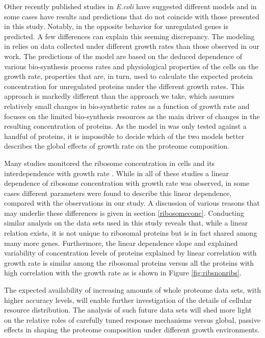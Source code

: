 \documentclass[a4paper]{article}
\begin{document}
Other recently published studies in \emph{E.coli} have suggested different models and in some cases have results  and predictions that do not coincide with those presented in this study.
Notably, in \cite{Klumpp2009a} the opposite behavior for unregulated genes is predicted.
A few differences can explain this seeming discrepancy.
The modeling in \cite{Klumpp2009a} relies on data collected under different growth rates than those observed in our work.
The predictions of the model are based on the deduced dependence of various bio-synthesis process rates and physiological properties of the cells on the growth rate, properties that are, in turn, used to calculate the expected protein concentration for unregulated proteins under the different growth rates.
This approach is markedly different than the approach we take, which assumes relatively small changes in bio-synthetic rates as a function of growth rate and focuses on the limited bio-synthesis resources as the main driver of changes in the resulting concentration of proteins.
As the model in \cite{Klumpp2009a} was only tested against a handful of proteins, it is impossible to decide which of the two models better describes the global effects of growth rate on the proteome composition.

Many studies monitored the ribosome concentration in cells and its interdependence with growth rate \cite{Scott2010,Schaechter1958,Bremer,Zaslaver2009,Bremer1987}.
While in all of these studies a linear dependence of ribosome concentration with growth rate was observed, in some cases different parameters were found to describe this linear dependence, compared with the observations in our study.
A discussion of various reasons that may underlie these differences is given in section \ref{ribosomeconc}.
Conducting similar analysis on the data sets used in this study reveals that, while a linear relation exists, it is not unique to ribosomal proteins but is in fact shared among many more genes.
Furthermore, the linear dependence slope and explained variability of concentration levels of proteins explained by linear correlation with growth rate is similar among the ribosomal proteins versus all the proteins with high correlation with the growth rate as is shown in Figure \ref{fig:ribsnonribs}.

The expected availability of increasing amounts of whole proteome data sets, with higher accuracy levels, will enable further investigation of the details of cellular resource distribution.
The analysis of such future data sets will shed more light on the relative roles of carefully tuned response mechanisms versus global, passive effects in shaping the proteome composition under different growth environments.
\end{document}
